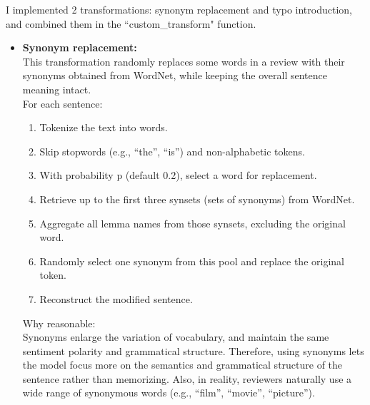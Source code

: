 \documentclass{article}
\begin{document}
I implemented 2 transformations: synonym replacement and typo introduction, and combined them in the ``custom\_transform" function. 
\begin{itemize}[leftmargin=1em]
    \item \textbf{Synonym replacement:}\\
    This transformation randomly replaces some words in a review with their synonyms obtained from WordNet, while keeping the overall sentence meaning intact.\\ 
    For each sentence:
    \begin{enumerate}
        \item Tokenize the text into words.
        \item Skip stopwords (e.g., “the”, “is”) and non-alphabetic tokens.
        \item With probability p (default 0.2), select a word for replacement.
        \item Retrieve up to the first three synsets (sets of synonyms) from WordNet.
        \item Aggregate all lemma names from those synsets, excluding the original word.
        \item Randomly select one synonym from this pool and replace the original token.
        \item Reconstruct the modified sentence.
    \end{enumerate}
    Why reasonable:\\
    Synonyms enlarge the variation of vocabulary, and maintain the same sentiment polarity and grammatical structure. Therefore, using synonyms lets the model focus more on the semantics and grammatical structure of the sentence rather than memorizing. Also, in reality, reviewers naturally use a wide range of synonymous words (e.g., “film”, “movie”, “picture”).\\
    

\end{itemize}
\end{document}
